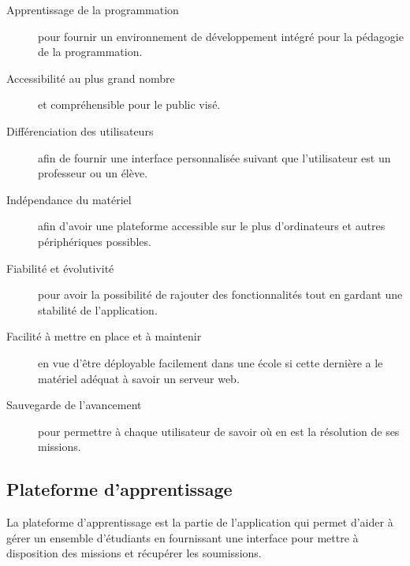 \begin{description}
  \item[Apprentissage de la programmation] pour fournir un environnement de développement intégré pour la pédagogie de la programmation.
  \item[Accessibilité au plus grand nombre] et compréhensible pour le public visé.
  \item[Différenciation des utilisateurs] afin de fournir une interface personnalisée suivant que l'utilisateur est un professeur ou un élève.
  \item[Indépendance du matériel] afin d'avoir une plateforme accessible sur le plus d'ordinateurs et autres périphériques possibles.
  \item[Fiabilité et évolutivité] pour avoir la possibilité de rajouter des fonctionnalités tout en gardant une stabilité de l'application.
  \item[Facilité à mettre en place et à maintenir] en vue d'être déployable facilement dans une école si cette dernière a le matériel adéquat à savoir un serveur web.
  \item[Sauvegarde de l'avancement] pour permettre à chaque utilisateur de savoir où en est la résolution de ses \glspl{mission}.
\end{description}

\subsection{Plateforme d'apprentissage}
La plateforme d'apprentissage est la partie de l'application qui permet d'aider à gérer un ensemble d'étudiants en fournissant une interface pour mettre à disposition des \glspl{mission} et récupérer les soumissions.

